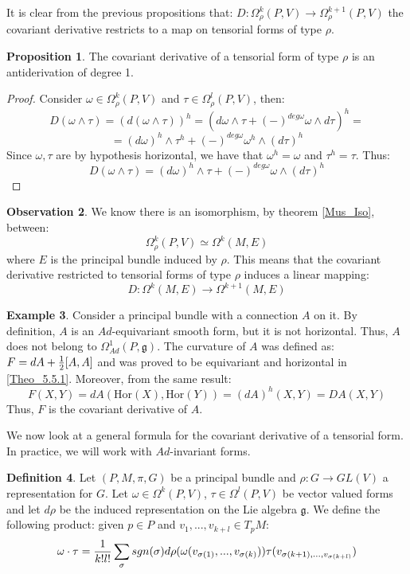 \documentclass[12pt,a4paper]{report}
\theoremstyle{definition}
\newtheorem{Def}{Definition}[chapter]
\theoremstyle{Theorem}
\newtheorem{Prop}[Def]{Proposition}
\theoremstyle{definition}
\newtheorem{Ex}[Def]{Example}
\theoremstyle{definition}
\newtheorem{Obs}[Def]{Observation}
\begin{document}
	It is clear from the previous propositions that: $D:\Omega^k_\rho(P,V)\rightarrow \Omega^{k+1}_\rho(P,V)$ the covariant derivative restricts to a map on tensorial forms of type $\rho$.
	\begin{Prop}\label{Prop_6.3.3}
		The covariant derivative of a tensorial form of type $\rho$ is an antiderivation of degree 1.
	\end{Prop}
	\begin{proof}
		Consider $\omega\in\Omega^k_\rho(P,V)$ and $\tau\in \Omega^l_\rho(P,V)$, then:
		$$D(\omega\wedge \tau)=(d(\omega\wedge\tau))^h=(d\omega\wedge \tau+(-)^{deg\omega}\omega\wedge  d\tau)^h=$$
		$$=(d\omega)^h\wedge \tau^h+(-)^{deg\omega}\omega^h\wedge(  d\tau)^h$$
		Since $\omega,\tau$ are by hypothesis horizontal, we have that $\omega^h=\omega$ and $\tau^h=\tau$. Thus:
		$$D(\omega\wedge \tau)=(d\omega)^h\wedge \tau+(-)^{deg\omega}\omega\wedge (d\tau)^h$$
	\end{proof}
	\begin{Obs}
		We know there is an isomorphism, by theorem \ref{Mus_Iso}, between:
		$$\Omega^k_\rho(P,V)\simeq\Omega^k(M,E)$$ where $E$ is the principal bundle induced by $\rho$. This means that the covariant derivative restricted to tensorial forms of type $\rho$ induces a linear mapping:
		$$D:\Omega^k(M,E)\rightarrow\Omega^{k+1}(M,E)$$
	\end{Obs}
	\begin{Ex}\label{Ex_6.3.1}
		Consider a principal bundle with a connection $A$ on it. By definition, $A$ is an $Ad$-equivariant smooth form, but it is not horizontal. Thus, $A$ does not belong to $\Omega^1_{Ad}(P,\mathfrak{g})$. The curvature of $A$ was defined as:
		$F=dA+{1\over 2}[A,A]$ and was proved to be equivariant and horizontal in \ref{Theo_5.5.1}. Moreover, from the same result:
		$$F(X,Y)=dA(\mathrm{Hor}(X),\mathrm{Hor}(Y))=(dA)^h(X,Y)=DA(X,Y)$$
		Thus, $F$ is the covariant derivative of $A$.
	\end{Ex}
	We now look at a general formula for the covariant derivative of a tensorial form. In practice, we will work with $Ad$-invariant forms.
	\begin{Def}\label{Def_6.3.3}
		Let $(P,M,\pi,G)$ be a principal bundle and $\rho:G\rightarrow GL(V)$ a representation for $G$. Let $\omega\in \Omega^k(P,V)$, $\tau\in\Omega^l(P,V)$ be vector valued forms and let $d\rho$ be the induced representation on the Lie algebra $\mathfrak{g}$. We define the following product: given $p\in P$ and $v_1,...,v_{k+l}\in T_pM$:
		$$\omega\cdot \tau={1\over k!l!}\sum_\sigma sgn(\sigma)d\rho(\omega(v_{\sigma(1)},...,v_{\sigma(k)}))\tau(v_{\sigma(k+1),...,v_{\sigma(k+l)}})$$
	\end{Def}
\end{document}
